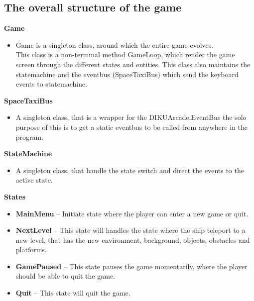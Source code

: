 \documentclass[../master.tex]{subfiles}
\begin{document}
\subsection{The overall structure of the game}
\textbf{Game}
\begin{itemize}
	\item[] Game is a singleton class, around which the entire game evolves.\\
	This class is a non-terminal method GameLoop, which render the game screen through the different states and entities. This class also maintains the statemachine and the eventbus (SpaceTaxiBus) which send the keyboard events to statemachine.
\end{itemize}
\textbf{SpaceTaxiBus}
\begin{itemize}
	\item[] A singleton class, that is a wrapper for the DIKUArcade.EventBus the solo purpose of this is to get a static eventbus to be called from anywhere in the program.
\end{itemize}
\textbf{StateMachine}
\begin{itemize}
	\item[] A singleton class, that handle the state switch and direct the events to the active state.
\end{itemize}

\textbf{States}
\begin{itemize}
	\item [] \textbf{MainMenu} -- Initiate state where the player can enter a new game or quit. 
	\item [] \textbf{NextLevel} -- This state will handles the state where the ship teleport to a new level, that has the new environment, background, objects, obstacles and platforms.
	\item [] \textbf{GamePaused} -- This state pauses the game momentarily, where the player should be able to quit the game.
	\item [] \textbf{Quit} -- This state will quit the game.\\
\end{itemize}
\end{document}

